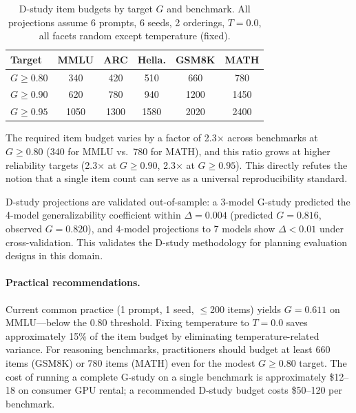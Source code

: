 \documentclass[letterpaper,11pt]{article}
\begin{document}
\begin{table}[t]
\centering
\caption{D-study item budgets by target $G$ and benchmark. All projections assume 6 prompts, 6 seeds, 2 orderings, $T=0.0$, all facets random except temperature (fixed).}
\label{tab:dstudy}
\small
\begin{tabular}{lccccc}
\toprule
\textbf{Target} & \textbf{MMLU} & \textbf{ARC} & \textbf{Hella.} & \textbf{GSM8K} & \textbf{MATH} \\
\midrule
$G \geq 0.80$ & 340 & 420 & 510 & 660 & 780 \\
$G \geq 0.90$ & 620 & 780 & 940 & 1200 & 1450 \\
$G \geq 0.95$ & 1050 & 1300 & 1580 & 2020 & 2400 \\
\bottomrule
\end{tabular}
\end{table}

The required item budget varies by a factor of 2.3$\times$ across benchmarks at $G \geq 0.80$ (340 for MMLU vs.\ 780 for MATH), and this ratio grows at higher reliability targets (2.3$\times$ at $G \geq 0.90$, 2.3$\times$ at $G \geq 0.95$).
This directly refutes the notion that a single item count can serve as a universal reproducibility standard.

D-study projections are validated out-of-sample: a 3-model G-study predicted the 4-model generalizability coefficient within $\Delta = 0.004$ (predicted $G = 0.816$, observed $G = 0.820$), and 4-model projections to 7 models show $\Delta < 0.01$ under cross-validation.
This validates the D-study methodology for planning evaluation designs in this domain.

\paragraph{Practical recommendations.}
Current common practice (1 prompt, 1 seed, $\leq$200 items) yields $G = 0.611$ on MMLU---below the 0.80 threshold.
Fixing temperature to $T = 0.0$ saves approximately 15\% of the item budget by eliminating temperature-related variance.
For reasoning benchmarks, practitioners should budget at least 660 items (GSM8K) or 780 items (MATH) even for the modest $G \geq 0.80$ target.
The cost of running a complete G-study on a single benchmark is approximately \$12--18 on consumer GPU rental; a recommended D-study budget costs \$50--120 per benchmark.

\end{document}
